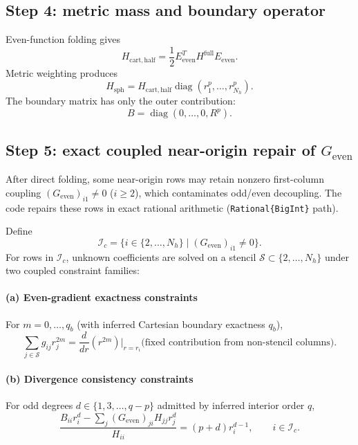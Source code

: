 \documentclass[
  aps,
  pre,
  reprint,
  superscriptaddress,
  nofootinbib
]{revtex4-2}
\newcommand{\diag}{\operatorname{diag}}
\newcommand{\Ee}{E_{\mathrm{even}}}
\newcommand{\Ge}{G_{\mathrm{even}}}
\newcommand{\Hs}{H_{\mathrm{sph}}}
\newcommand{\Hc}{H_{\mathrm{cart,half}}}
\begin{document}
\subsection{Step 4: metric mass and boundary operator}
Even-function folding gives
\begin{equation}
\Hc = \frac{1}{2}\Ee^T H^{\mathrm{full}}\Ee.
\end{equation}
Metric weighting produces
\begin{equation}
\Hs = \Hc\diag(r_1^p,\ldots,r_{N_h}^p).
\end{equation}
The boundary matrix has only the outer contribution:
\begin{equation}
B=\diag(0,\ldots,0,R^p).
\end{equation}

\subsection{Step 5: exact coupled near-origin repair of \texorpdfstring{$\Ge$}{Ge}}
\label{sec:repair}
After direct folding, some near-origin rows may retain nonzero first-column coupling
$(\Ge)_{i1}\neq 0$ ($i\ge2$), which contaminates odd/even decoupling. The code repairs
these rows in exact rational arithmetic (\texttt{Rational\{BigInt\}} path).

Define
\begin{equation}
\mathcal{I}_c=\{i\in\{2,\ldots,N_h\}\mid (\Ge)_{i1}\neq 0\}.
\end{equation}
For rows in $\mathcal{I}_c$, unknown coefficients are solved on a stencil
$\mathcal{S}\subset\{2,\ldots,N_h\}$ under two coupled constraint families:

\paragraph*{(a) Even-gradient exactness constraints}
For $m=0,\ldots,q_b$ (with inferred Cartesian boundary exactness $q_b$),
\begin{equation}
\sum_{j\in\mathcal{S}} g_{ij}r_j^{2m}
=
\frac{d}{dr}\left(r^{2m}\right)\Big|_{r=r_i}
\text{(fixed contribution from non-stencil columns)}.
\end{equation}

\paragraph*{(b) Divergence consistency constraints}
For odd degrees $d\in\{1,3,\ldots,q-p\}$ admitted by inferred interior order $q$,
\begin{equation}
\frac{B_{ii}r_i^{d}-\sum_{j}(\Ge)_{ji}H_{jj}r_j^{d}}{H_{ii}}
=(p+d)r_i^{d-1},\qquad i\in\mathcal{I}_c.
\end{equation}
\end{document}
